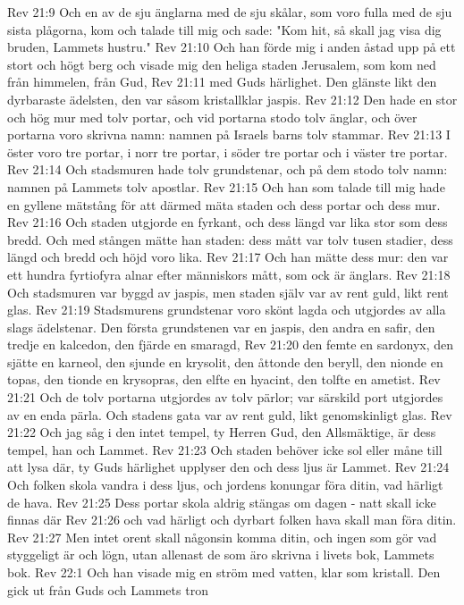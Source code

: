 Rev 21:9  Och en av de sju änglarna med de sju skålar, som voro fulla med de sju sista plågorna, kom och talade till mig och sade: "Kom hit, så skall jag visa dig bruden, Lammets hustru."
Rev 21:10  Och han förde mig i anden åstad upp på ett stort och högt berg och visade mig den heliga staden Jerusalem, som kom ned från himmelen, från Gud,
Rev 21:11  med Guds härlighet. Den glänste likt den dyrbaraste ädelsten, den var såsom kristallklar jaspis.
Rev 21:12  Den hade en stor och hög mur med tolv portar, och vid portarna stodo tolv änglar, och över portarna voro skrivna namn: namnen på Israels barns tolv stammar.
Rev 21:13  I öster voro tre portar, i norr tre portar, i söder tre portar och i väster tre portar.
Rev 21:14  Och stadsmuren hade tolv grundstenar, och på dem stodo tolv namn: namnen på Lammets tolv apostlar.
Rev 21:15  Och han som talade till mig hade en gyllene mätstång för att därmed mäta staden och dess portar och dess mur.
Rev 21:16  Och staden utgjorde en fyrkant, och dess längd var lika stor som dess bredd. Och med stången mätte han staden: dess mått var tolv tusen stadier, dess längd och bredd och höjd voro lika.
Rev 21:17  Och han mätte dess mur: den var ett hundra fyrtiofyra alnar efter människors mått, som ock är änglars.
Rev 21:18  Och stadsmuren var byggd av jaspis, men staden själv var av rent guld, likt rent glas.
Rev 21:19  Stadsmurens grundstenar voro skönt lagda och utgjordes av alla slags ädelstenar. Den första grundstenen var en jaspis, den andra en safir, den tredje en kalcedon, den fjärde en smaragd,
Rev 21:20  den femte en sardonyx, den sjätte en karneol, den sjunde en krysolit, den åttonde den beryll, den nionde en topas, den tionde en krysopras, den elfte en hyacint, den tolfte en ametist.
Rev 21:21  Och de tolv portarna utgjordes av tolv pärlor; var särskild port utgjordes av en enda pärla. Och stadens gata var av rent guld, likt genomskinligt glas.
Rev 21:22  Och jag såg i den intet tempel, ty Herren Gud, den Allsmäktige, är dess tempel, han och Lammet.
Rev 21:23  Och staden behöver icke sol eller måne till att lysa där, ty Guds härlighet upplyser den och dess ljus är Lammet.
Rev 21:24  Och folken skola vandra i dess ljus, och jordens konungar föra ditin, vad härligt de hava.
Rev 21:25  Dess portar skola aldrig stängas om dagen - natt skall icke finnas där
Rev 21:26  och vad härligt och dyrbart folken hava skall man föra ditin.
Rev 21:27  Men intet orent skall någonsin komma ditin, och ingen som gör vad styggeligt är och lögn, utan allenast de som äro skrivna i livets bok, Lammets bok.
Rev 22:1  Och han visade mig en ström med vatten, klar som kristall. Den gick ut från Guds och Lammets tron
